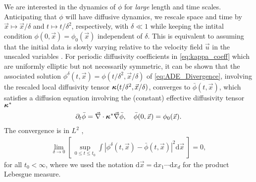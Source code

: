 \documentclass[11pt]{amsart}
\renewcommand{\d}{\mathrm{d}}
\newcommand\bkappa{\mbox{\boldmath${\kappa}$}}
\begin{document}
We are interested in the dynamics of $\phi$ for \emph{large} length and
time scales. Anticipating that $\phi$ will have diffusive dynamics, we
rescale space and time by $\vec{x}\mapsto\vec{x}/\delta$ and $t\mapsto t/\delta^2$,
respectively, with $\delta\ll1$ while keeping the intital condition
$\phi(0,\vec{x})=\phi_0(\vec{x})$ independent 
of $\delta$. This is equivalent to assuming that the initial data is slowly
varying relative to the velocity field $\vec{u}$ in the unscaled
variables
\cite{McLaughlin:SIAM_JAM:780,Fannjiang:SIAM_JAM:333,Fannjiang:1997:1033}. 
For periodic diffusivity coefficients in \eqref{eq:kappa_coeff} which
are uniformly elliptic but not necessarily symmetric, it can be shown 
\cite{Fannjiang:SIAM_JAM:333} that the associated solution
$\phi^\delta(t,\vec{x})=\phi(t/\delta^2,\vec{x}/\delta)$  of \eqref{eq:ADE_Divergence},
involving the rescaled local diffusivity tensor
$\bkappa(t/\delta^2,\vec{x}/\delta)$, converges to $\bar{\phi}(t,\vec{x})$, which
satisfies a diffusion equation involving the (constant) effective
diffusivity tensor $\bkappa^*$
%
\begin{align}
  \partial_t\bar{\phi}=\vec{\nabla}\cdot\bkappa^*\vec{\nabla}\bar{\phi}, \quad
  \bar{\phi}(0,\vec{x})=\phi_0(\vec{x}).
\end{align}
%
The convergence is in $L^2$ \cite{Fannjiang:SIAM_JAM:333},
%
\begin{align}
  \lim_{\delta\to0}\left[\,\sup_{0\leq t\leq t_0}
    \int\left|\phi^\delta(t,\vec{x})-\bar{\phi}(t,\vec{x})\right|^2\d\vec{x}
    \;\right]=0,
\end{align}
%
for all $t_0<\infty$, where we used the notation $\d\vec{x}=\d x_1\cdots \d x_d$ for
the product Lebesgue measure.
\end{document}
